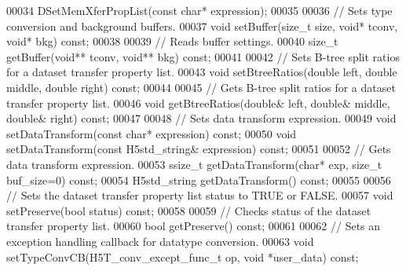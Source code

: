 \begin{DoxyCode}
00034         DSetMemXferPropList(\textcolor{keyword}{const} \textcolor{keywordtype}{char}* expression);
00035 
00036         \textcolor{comment}{// Sets type conversion and background buffers.}
00037         \textcolor{keywordtype}{void} setBuffer(\textcolor{keywordtype}{size\_t} size, \textcolor{keywordtype}{void}* tconv, \textcolor{keywordtype}{void}* bkg) \textcolor{keyword}{const};
00038 
00039         \textcolor{comment}{// Reads buffer settings.}
00040         \textcolor{keywordtype}{size\_t} getBuffer(\textcolor{keywordtype}{void}** tconv, \textcolor{keywordtype}{void}** bkg) \textcolor{keyword}{const};
00041 
00042         \textcolor{comment}{// Sets B-tree split ratios for a dataset transfer property list.}
00043         \textcolor{keywordtype}{void} setBtreeRatios(\textcolor{keywordtype}{double} left, \textcolor{keywordtype}{double} middle, \textcolor{keywordtype}{double} right) \textcolor{keyword}{const};
00044 
00045         \textcolor{comment}{// Gets B-tree split ratios for a dataset transfer property list.}
00046         \textcolor{keywordtype}{void} getBtreeRatios(\textcolor{keywordtype}{double}& left, \textcolor{keywordtype}{double}& middle, \textcolor{keywordtype}{double}& right) \textcolor{keyword}{const};
00047 
00048         \textcolor{comment}{// Sets data transform expression.}
00049         \textcolor{keywordtype}{void} setDataTransform(\textcolor{keyword}{const} \textcolor{keywordtype}{char}* expression) \textcolor{keyword}{const};
00050         \textcolor{keywordtype}{void} setDataTransform(\textcolor{keyword}{const} H5std\_string& expression) \textcolor{keyword}{const};
00051 
00052         \textcolor{comment}{// Gets data transform expression.}
00053         ssize\_t getDataTransform(\textcolor{keywordtype}{char}* exp, \textcolor{keywordtype}{size\_t} buf\_size=0) \textcolor{keyword}{const};
00054         H5std\_string getDataTransform() \textcolor{keyword}{const};
00055 
00056         \textcolor{comment}{// Sets the dataset transfer property list status to TRUE or FALSE.}
00057         \textcolor{keywordtype}{void} setPreserve(\textcolor{keywordtype}{bool} status) \textcolor{keyword}{const};
00058 
00059         \textcolor{comment}{// Checks status of the dataset transfer property list.}
00060         \textcolor{keywordtype}{bool} getPreserve() \textcolor{keyword}{const};
00061 
00062         \textcolor{comment}{// Sets an exception handling callback for datatype conversion.}
00063         \textcolor{keywordtype}{void} setTypeConvCB(H5T\_conv\_except\_func\_t op, \textcolor{keywordtype}{void} *user\_data) \textcolor{keyword}{const};

\end{DoxyCode}
